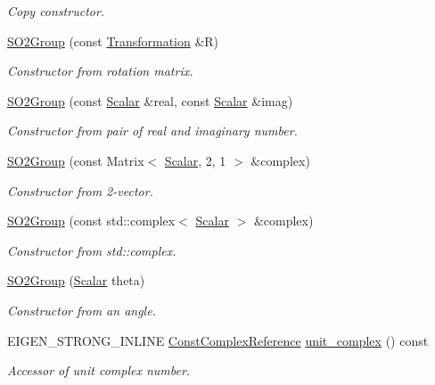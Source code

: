 \begin{DoxyCompactItemize}
\begin{DoxyCompactList}\small\item\em Copy constructor. \end{DoxyCompactList}\item 
\hyperlink{class_sophus_1_1_s_o2_group_a1f14c9f18b554399498515a7df008aa8}{S\+O2\+Group} (const \hyperlink{class_sophus_1_1_s_o2_group_a27d15c5fed370e583c258baf1abe8c62}{Transformation} \&R)
\begin{DoxyCompactList}\small\item\em Constructor from rotation matrix. \end{DoxyCompactList}\item 
\hyperlink{class_sophus_1_1_s_o2_group_a3c82efc2c592d1490ed150e1277bc59e}{S\+O2\+Group} (const \hyperlink{class_sophus_1_1_s_o2_group_a752943ea935a3007be93245ddd16bc74}{Scalar} \&real, const \hyperlink{class_sophus_1_1_s_o2_group_a752943ea935a3007be93245ddd16bc74}{Scalar} \&imag)
\begin{DoxyCompactList}\small\item\em Constructor from pair of real and imaginary number. \end{DoxyCompactList}\item 
\hyperlink{class_sophus_1_1_s_o2_group_a55aa0613418ec0e502308f8a7771008e}{S\+O2\+Group} (const Matrix$<$ \hyperlink{class_sophus_1_1_s_o2_group_a752943ea935a3007be93245ddd16bc74}{Scalar}, 2, 1 $>$ \&complex)
\begin{DoxyCompactList}\small\item\em Constructor from 2-\/vector. \end{DoxyCompactList}\item 
\hyperlink{class_sophus_1_1_s_o2_group_a44ebc87adef86623579747cf3cd24fa3}{S\+O2\+Group} (const std\+::complex$<$ \hyperlink{class_sophus_1_1_s_o2_group_a752943ea935a3007be93245ddd16bc74}{Scalar} $>$ \&complex)
\begin{DoxyCompactList}\small\item\em Constructor from std\+::complex. \end{DoxyCompactList}\item 
\hyperlink{class_sophus_1_1_s_o2_group_ad76cee9b273810bebc943494c5d6feed}{S\+O2\+Group} (\hyperlink{class_sophus_1_1_s_o2_group_a752943ea935a3007be93245ddd16bc74}{Scalar} theta)\hypertarget{class_sophus_1_1_s_o2_group_ad76cee9b273810bebc943494c5d6feed}{}\label{class_sophus_1_1_s_o2_group_ad76cee9b273810bebc943494c5d6feed}

\begin{DoxyCompactList}\small\item\em Constructor from an angle. \end{DoxyCompactList}\item 
E\+I\+G\+E\+N\+\_\+\+S\+T\+R\+O\+N\+G\+\_\+\+I\+N\+L\+I\+NE \hyperlink{class_sophus_1_1_s_o2_group_a7d6e7964e8be6e4a79a6873382d2c996}{Const\+Complex\+Reference} \hyperlink{class_sophus_1_1_s_o2_group_a96180bf3ec6c2935af72f94a6e8d700d}{unit\+\_\+complex} () const 
\begin{DoxyCompactList}\small\item\em Accessor of unit complex number. \end{DoxyCompactList}\end{DoxyCompactItemize}
